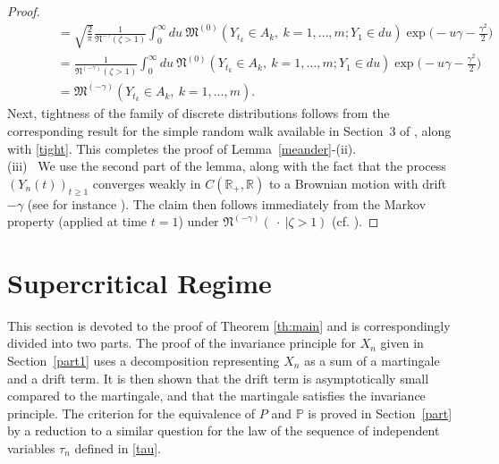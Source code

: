 \documentclass[12pt]{amsart}
\begin{document}
\begin{proof}
\begin{eqnarray*}
&& \qquad =\sqrt{{\frac {\displaystyle {2}}{\displaystyle {\pi} }}}{\frac {\displaystyle {1}}{\displaystyle {{{\mathfrak N}}^{-\gamma}(\zeta
>1)} }}\int_0^\infty du \ {{\mathfrak M}}^{(0)}(Y_{t_k}\in A_k,~k=1,\ldots,m;Y_1\in
du)
\exp\Bigr(-u\gamma-{\frac {\displaystyle {\gamma^2}}{\displaystyle {2} }}\Bigr)\\
&& \qquad ={\frac {\displaystyle {1}}{\displaystyle {{{\mathfrak N}}^{(-\gamma)}(\zeta >1)} }}\int_0^\infty du \
{{\mathfrak N}}^{(0)}(Y_{t_k}\in A_k,~k=1,\ldots,m;Y_1\in du)
\exp\Bigr(-u\gamma-{\frac {\displaystyle {\gamma^2}}{\displaystyle {2} }}\Bigr)
\\
&& \qquad ={{\mathfrak M}}^{(-\gamma)}(Y_{t_k}\in A_k,~k=1,\ldots,m). \end{eqnarray*}
Next, tightness of the family of discrete distributions follows from
the corresponding result for the simple random walk available in
Section~3 of \cite{iglehart}, along with \eqref{tight}. This
completes the proof of Lemma~\ref{meander}-(ii).
\\
$\mbox{}$
\\
(iii)~ We use the second part of the lemma, along with the fact that
the process $(Y_n(t))_{t \ge 1}$ converges weakly in $C({{\mathbb R}}_+,{{\mathbb R}})$
to a Brownian motion with drift $-\gamma$ (see for instance
\cite[Theorem~II.3.2]{jacod}). The claim then follows immediately from
the Markov property (applied at time $t=1$) under
${{\mathfrak N}}^{(-\gamma)}(~\cdot~|\zeta>1)$ (cf. \cite[Section~VI.48]{rw2}).
\end{proof}
\section{Supercritical Regime}
\label{sec:super} This section is devoted to the proof of Theorem
\ref{th:main} and is correspondingly divided into two parts. The
proof of the invariance principle for $X_n $ given in
Section~\ref{part1} uses a decomposition representing $X_n$ as a sum
of a martingale and a drift term. It is then shown that the drift
term is asymptotically small compared to the martingale, and that
the martingale satisfies the invariance principle. The criterion for
the equivalence of $P$ and ${{\mathbb P}}$ is proved in Section~\ref{part} by
a reduction to a similar question for the law of the sequence of
independent variables $\tau_n$ defined in \eqref{tau}.
\end{document}
